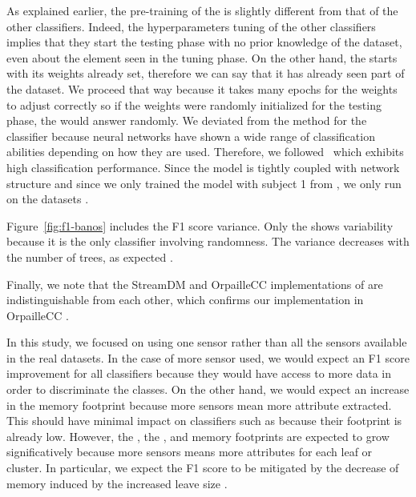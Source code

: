 As explained earlier, the pre-training of the \FNN is slightly different from that of the other
classifiers. Indeed, the hyperparameters tuning of the other classifiers implies
that they start the testing phase with no prior knowledge of the dataset, even
about the element seen in the tuning phase. On the other hand, the \FNN starts
with its weights already set, therefore we can say that it has already seen part
of the dataset. We proceed that way because it takes many epochs for the weights
to adjust correctly so if the weights were randomly initialized for the testing
phase, the \FNN would answer randomly.  We deviated from the method for the \FNN
classifier because neural networks have shown a wide range of classification
abilities depending on how they are used.  Therefore, we
followed~\cite{omid_2019} which exhibits high classification performance. Since
the \FNN model is tightly coupled with network structure and since we only
trained the model with subject 1 from \banosdataset, we only run \FNN on the
\banosdataset datasets .

Figure~\ref{fig:f1-banos} includes the F1 score variance. Only the
\mondrianforest shows variability because it is the only classifier involving
randomness. The variance decreases with the number of trees, as expected .


Finally, we note that the StreamDM and OrpailleCC implementations of
\naivebayes are indistinguishable from each other, which confirms our
implementation in OrpailleCC .

In this study, we focused on using one sensor rather than all the sensors
available in the real datasets. In the case of more sensor used, we would expect
an F1 score improvement for all classifiers because they would have access to
more data in order to discriminate the classes. On the other hand, we would
expect an increase in the memory footprint because more sensors mean more
attribute extracted. This should have minimal impact on classifiers such as
\naivebayes because their footprint is already low. However, the
\mondrianforest, the \hoeffdingtree, and \mcnn memory footprints are expected to
grow significatively because more sensors means more attributes for each leaf or
cluster. In particular, we expect the \mondrianforest F1 score to be mitigated
by the decrease of memory induced by the increased leave size .

